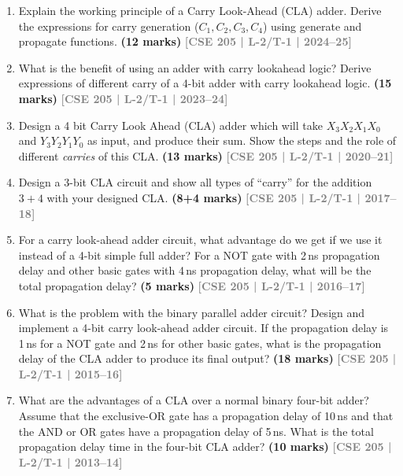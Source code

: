 \documentclass[12pt]{article}
\newcommand{\yr}[1]{\hfill\textcolor{gray}{\small\textbf{[#1]}}}
\newcommand{\mk}[1]{\textcolor{orange!70!black}{\small\textbf{(#1 marks)}}}
\begin{document}
\begin{enumerate}

\item Explain the working principle of a Carry Look-Ahead (CLA) adder. Derive the expressions for carry generation ($C_1, C_2, C_3, C_4$) using generate and propagate functions.
\mk{12} \yr{CSE 205 | L-2/T-1 | 2024--25}



\item What is the benefit of using an adder with carry lookahead logic? Derive expressions of different carry of a 4-bit adder with carry lookahead logic.
\mk{15} \yr{CSE 205 | L-2/T-1 | 2023--24}



\item Design a 4 bit Carry Look Ahead (CLA) adder which will take $X_3X_2X_1X_0$ and $Y_3Y_2Y_1Y_0$ as input, and produce their sum. Show the steps and the role of different \textit{carries} of this CLA.
\mk{13} \yr{CSE 205 | L-2/T-1 | 2020--21}



\item Design a 3-bit CLA circuit and show all types of ``carry'' for the addition $3+4$ with your designed CLA.
\mk{8+4} \yr{CSE 205 | L-2/T-1 | 2017--18}



\item For a carry look-ahead adder circuit, what advantage do we get if we use it instead of a 4-bit simple full adder? For a NOT gate with 2\,ns propagation delay and other basic gates with 4\,ns propagation delay, what will be the total propagation delay?
\mk{5} \yr{CSE 205 | L-2/T-1 | 2016--17}



\item What is the problem with the binary parallel adder circuit? Design and implement a 4-bit carry look-ahead adder circuit. If the propagation delay is 1\,ns for a NOT gate and 2\,ns for other basic gates, what is the propagation delay of the CLA adder to produce its final output?
\mk{18} \yr{CSE 205 | L-2/T-1 | 2015--16}



\item What are the advantages of a CLA over a normal binary four-bit adder? Assume that the exclusive-OR gate has a propagation delay of 10\,ns and that the AND or OR gates have a propagation delay of 5\,ns. What is the total propagation delay time in the four-bit CLA adder?
\mk{10} \yr{CSE 205 | L-2/T-1 | 2013--14}



\end{enumerate}
\end{document}
